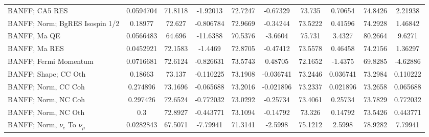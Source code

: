 \begin{tabular}{| l | S | S  S | S  S | S  S | S  S | }
                                                                  BANFF; CA5 RES &       0.0594704 &         71.8118 &        -1.92013 &         72.7247 &        -0.67329 &          73.735 &         0.70654 &         74.8426 &         2.21938 \\ 
                                                  BANFF; Norm; BgRES Isospin 1/2 &         0.18977 &          72.627 &       -0.806784 &         72.9669 &        -0.34244 &         73.5222 &         0.41596 &         74.2928 &         1.46842 \\ 
                                                                    BANFF, Ma QE &       0.0566483 &          64.696 &        -11.6388 &         70.5376 &         -3.6604 &          75.731 &          3.4327 &         80.2664 &          9.6271 \\ 
                                                                   BANFF, Ma RES &       0.0452921 &         72.1583 &         -1.4469 &         72.8705 &        -0.47412 &         73.5578 &         0.46458 &         74.2156 &         1.36297 \\ 
                                                           BANFF; Fermi Momentum &       0.0716681 &         72.6124 &       -0.826631 &         73.5743 &         0.48705 &         72.1652 &         -1.4375 &         69.8285 &        -4.62886 \\ 
                                                            BANFF; Shape; CC Oth &         0.18663 &          73.137 &       -0.110225 &         73.1908 &       -0.036741 &         73.2446 &        0.036741 &         73.2984 &        0.110222 \\ 
                                                             BANFF; Norm, CC Coh &        0.274896 &         73.1696 &       -0.065688 &         73.2016 &       -0.021896 &         73.2337 &        0.021896 &         73.2658 &        0.065688 \\ 
                                                             BANFF; Norm, NC Coh &        0.297426 &         72.6524 &       -0.772032 &         73.0292 &        -0.25734 &         73.4061 &         0.25734 &         73.7829 &        0.772032 \\ 
                                                             BANFF; Norm, NC Oth &             0.3 &         72.8927 &       -0.443771 &         73.1094 &        -0.14792 &          73.326 &         0.14792 &         73.5426 &        0.443771 \\ 
                                           BANFF; Norm, $\nu_{e}$ To $\nu_{\mu}$ &       0.0282843 &         67.5071 &        -7.79941 &         71.3141 &         -2.5998 &         75.1212 &          2.5998 &         78.9282 &         7.79941 \\ 

\end{tabular}
